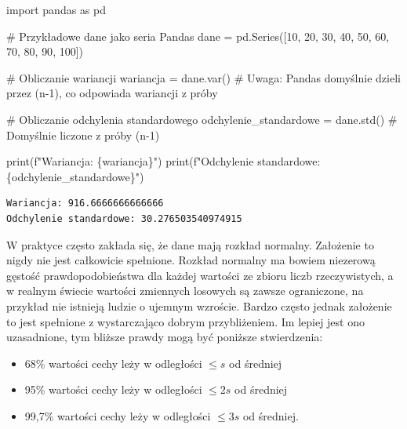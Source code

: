 \documentclass[
  polish,
  letterpaper,
  DIV=11,
  numbers=noendperiod]{scrreprt}
\newenvironment{Shaded}{\begin{snugshade}}{\end{snugshade}}
\newcommand{\BuiltInTok}[1]{\textcolor[rgb]{0.00,0.23,0.31}{#1}}
\newcommand{\CommentTok}[1]{\textcolor[rgb]{0.37,0.37,0.37}{#1}}
\newcommand{\DecValTok}[1]{\textcolor[rgb]{0.68,0.00,0.00}{#1}}
\newcommand{\ImportTok}[1]{\textcolor[rgb]{0.00,0.46,0.62}{#1}}
\newcommand{\NormalTok}[1]{\textcolor[rgb]{0.00,0.23,0.31}{#1}}
\newcommand{\OperatorTok}[1]{\textcolor[rgb]{0.37,0.37,0.37}{#1}}
\newcommand{\SpecialCharTok}[1]{\textcolor[rgb]{0.37,0.37,0.37}{#1}}
\newcommand{\SpecialStringTok}[1]{\textcolor[rgb]{0.13,0.47,0.30}{#1}}
\providecommand{\tightlist}{%
  \setlength{\itemsep}{0pt}\setlength{\parskip}{0pt}}
\begin{document}
\begin{Shaded}
\begin{Highlighting}[]
\ImportTok{import}\NormalTok{ pandas }\ImportTok{as}\NormalTok{ pd}

\CommentTok{\# Przykładowe dane jako seria Pandas}
\NormalTok{dane }\OperatorTok{=}\NormalTok{ pd.Series([}\DecValTok{10}\NormalTok{, }\DecValTok{20}\NormalTok{, }\DecValTok{30}\NormalTok{, }\DecValTok{40}\NormalTok{, }\DecValTok{50}\NormalTok{, }\DecValTok{60}\NormalTok{, }\DecValTok{70}\NormalTok{, }\DecValTok{80}\NormalTok{, }\DecValTok{90}\NormalTok{, }\DecValTok{100}\NormalTok{])}

\CommentTok{\# Obliczanie wariancji}
\NormalTok{wariancja }\OperatorTok{=}\NormalTok{ dane.var()  }\CommentTok{\# Uwaga: Pandas domyślnie dzieli przez (n{-}1), co odpowiada wariancji z próby}

\CommentTok{\# Obliczanie odchylenia standardowego}
\NormalTok{odchylenie\_standardowe }\OperatorTok{=}\NormalTok{ dane.std()  }\CommentTok{\# Domyślnie liczone z próby (n{-}1)}

\BuiltInTok{print}\NormalTok{(}\SpecialStringTok{f"Wariancja: }\SpecialCharTok{\{}\NormalTok{wariancja}\SpecialCharTok{\}}\SpecialStringTok{"}\NormalTok{)}
\BuiltInTok{print}\NormalTok{(}\SpecialStringTok{f"Odchylenie standardowe: }\SpecialCharTok{\{}\NormalTok{odchylenie\_standardowe}\SpecialCharTok{\}}\SpecialStringTok{"}\NormalTok{)}
\end{Highlighting}
\end{Shaded}

\begin{verbatim}
Wariancja: 916.6666666666666
Odchylenie standardowe: 30.276503540974915
\end{verbatim}

W praktyce często zakłada się, że dane mają rozkład normalny. Założenie
to nigdy nie jest całkowicie spełnione. Rozkład normalny ma bowiem
niezerową gęstość prawdopodobieństwa dla każdej wartości ze zbioru liczb
rzeczywistych, a w realnym świecie wartości zmiennych losowych są zawsze
ograniczone, na przykład nie istnieją ludzie o ujemnym wzroście. Bardzo
często jednak założenie to jest spełnione z wystarczająco dobrym
przybliżeniem. Im lepiej jest ono uzasadnione, tym bliższe prawdy mogą
być poniższe stwierdzenia:

\begin{itemize}
\tightlist
\item
  68\% wartości cechy leży w odległości \(\leqslant s\) od średniej
\item
  95\% wartości cechy leży w odległości \(\leqslant 2s\) od średniej
\item
  99,7\% wartości cechy leży w odległości \(\leqslant 3s\) od średniej.
\end{itemize}
\end{document}
